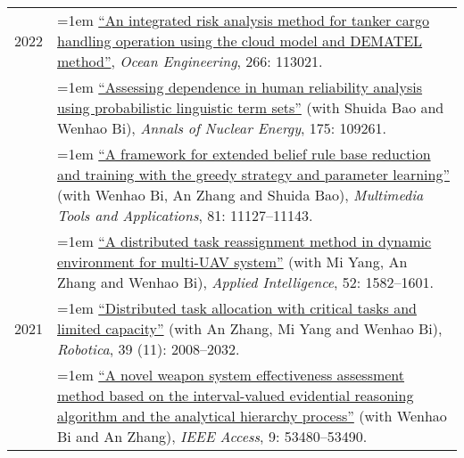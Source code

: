 \documentclass[11pt,english]{article}
\begin{document}
\begin{tabular}{p{.85in}>{\hangindent=1em}p{5.65in}<{\raggedright}}
2022 &  \href{https://doi.org/10.1016/j.oceaneng.2022.113021}{``An integrated risk analysis method for tanker cargo handling operation using the cloud model and DEMATEL method''}, \textit{Ocean Engineering}, 266: 113021. \\

 &  \href{https://doi.org/10.1016/j.anucene.2022.109261}{``Assessing dependence in human reliability analysis using probabilistic linguistic term sets''} (with Shuida Bao and Wenhao Bi), \textit{Annals of Nuclear Energy}, 175: 109261. \\
 
 &  \href{https://doi.org/10.1007/s11042-022-12232-4}{``A framework for extended belief rule base reduction and training with the greedy strategy and parameter learning''} (with Wenhao Bi, An Zhang and Shuida Bao), \textit{Multimedia Tools and Applications}, 81: 11127--11143. \\
 &  \href{https://doi.org/10.1007/s10489-021-02502-3}{``A distributed task reassignment method in dynamic environment for multi-UAV system''} (with Mi Yang, An Zhang and Wenhao Bi), \textit{Applied Intelligence}, 52: 1582--1601. \\
2021 &  \href{https://doi.org/10.1017/S0263574721000102}{``Distributed task allocation with critical tasks and limited capacity''} (with An Zhang, Mi Yang and Wenhao Bi), \textit{Robotica}, 39 (11): 2008--2032. \\
 &  \href{https://doi.org/10.1109/ACCESS.2021.3071419}{``A novel weapon system effectiveness assessment method based on the interval-valued evidential reasoning algorithm and the analytical hierarchy process''} (with Wenhao Bi and An Zhang), \textit{IEEE Access}, 9: 53480--53490. \\
 \end{tabular}
\end{document}
